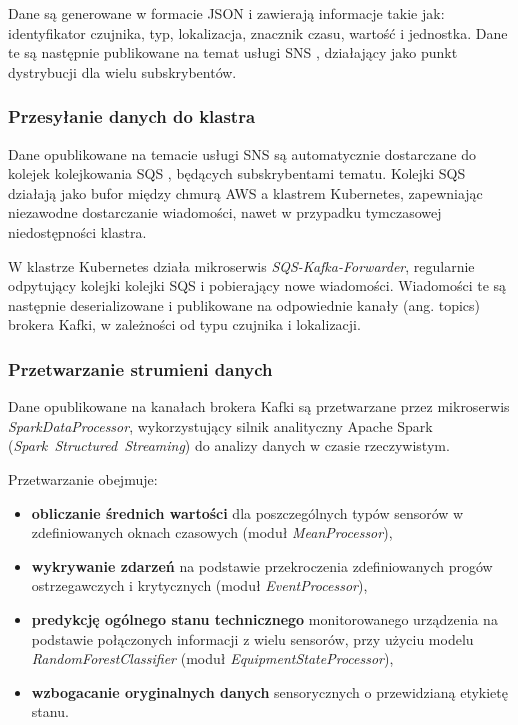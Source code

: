 Dane są generowane w formacie JSON i zawierają informacje takie jak: identyfikator czujnika, typ, lokalizacja, znacznik czasu, wartość i
jednostka. Dane te są następnie publikowane na temat usługi SNS \cite{sns_docs}, działający jako punkt dystrybucji dla wielu subskrybentów.

\subsubsection{Przesyłanie danych do klastra}
\label{subsubsec:przesylanie_danych}

Dane opublikowane na temacie usługi SNS są automatycznie dostarczane do kolejek kolejkowania SQS \cite{sqs_docs}, będących subskrybentami tematu. Kolejki SQS działają jako bufor między chmurą AWS a klastrem Kubernetes, zapewniając niezawodne dostarczanie wiadomości, nawet w przypadku tymczasowej niedostępności klastra.

W klastrze Kubernetes działa mikroserwis \textit{SQS-Kafka-Forwarder}, regularnie odpytujący kolejki kolejki SQS i pobierający nowe wiadomości. Wiadomości te są następnie deserializowane i publikowane na odpowiednie kanały (ang. topics) brokera Kafki, w zależności od typu czujnika i lokalizacji.

\subsubsection{Przetwarzanie strumieni danych}
\label{subsubsec:przetwarzanie_strumieni}

Dane opublikowane na kanałach brokera Kafki są przetwarzane przez mikroserwis \\ \textit{SparkDataProcessor}, wykorzystujący silnik analityczny Apache Spark \mbox{(\textit{Spark Structured Streaming})} \cite{spark_streaming} do analizy danych w czasie rzeczywistym. 

\vspace{0.3em}

Przetwarzanie obejmuje:

\begin{itemize}
    \item \textbf{obliczanie średnich wartości} dla poszczególnych typów sensorów w zdefiniowanych oknach czasowych (moduł \textit{MeanProcessor}),
    \item \textbf{wykrywanie zdarzeń} na podstawie przekroczenia zdefiniowanych progów ostrzegawczych i krytycznych (moduł \textit{EventProcessor}),
    \item \textbf{predykcję ogólnego stanu technicznego} monitorowanego urządzenia na podstawie połączonych informacji z wielu sensorów, przy użyciu modelu \textit{RandomForestClassifier} (moduł \textit{EquipmentStateProcessor}),
    \item \textbf{wzbogacanie oryginalnych danych} sensorycznych o przewidzianą etykietę stanu.
\end{itemize}

